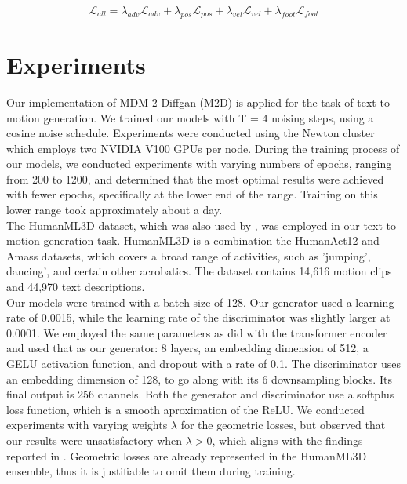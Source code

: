 \documentclass[10pt,twocolumn,letterpaper]{article}
\begin{document}
\begin{equation}\label{eq:losses}
	\mathcal{L}_{all} = \lambda_{adv}\mathcal{L}_{adv} + \lambda_{pos}\mathcal{L}_{pos} + \lambda_{vel}\mathcal{L}_{vel} + \lambda_{foot}\mathcal{L}_{foot} 
\end{equation}

\section{Experiments}
\label{sec:experiments}
Our implementation of MDM-2-Diffgan (M2D) is applied for the task of text-to-motion generation. We trained our models with T = 4 noising steps, 
using a cosine noise schedule. Experiments were conducted using the Newton cluster which employs two NVIDIA V100 GPUs per node. During the 
training process of our models, we conducted experiments with varying numbers of epochs, ranging from 200 to 1200, and determined that the 
most optimal results were achieved with fewer epochs, specifically at the lower end of the range. Training on this lower range took approximately
about a day.
\\

The HumanML3D dataset, which was also used by \cite{Tevet23}, was employed in our text-to-motion generation task. HumanML3D \cite{Guo_2022_CVPR}
is a combination the HumanAct12 \cite{guo2020action2motion} and Amass \cite{Amass} datasets, which covers a broad range of activities, such as 'jumping', 
dancing', and certain other acrobatics. The dataset contains 14,616 motion clips and 44,970 text descriptions.
\\

Our models were trained with a batch size of 128. Our generator used a learning rate of 0.0015, while the learning rate of the discriminator was slightly 
larger at 0.0001. We employed the same parameters as \cite{Tevet23} did with the transformer encoder and used that as our generator: 8 layers, an embedding 
dimension of 512, a GELU activation function, and dropout with a rate of 0.1. The discriminator uses an embedding dimension of 128, to go along with its 6 
downsampling blocks. Its final output is 256 channels. Both the generator and discriminator use a softplus loss function, which is a smooth aproximation 
of the ReLU. We conducted experiments with varying weights $\lambda$ for the geometric losses, but observed that our results were unsatisfactory when 
$\lambda > 0$, which aligns with the findings reported in \cite{Tevet23}. Geometric losses are already represented in the HumanML3D ensemble, thus it is
justifiable to omit them during training.
\end{document}

